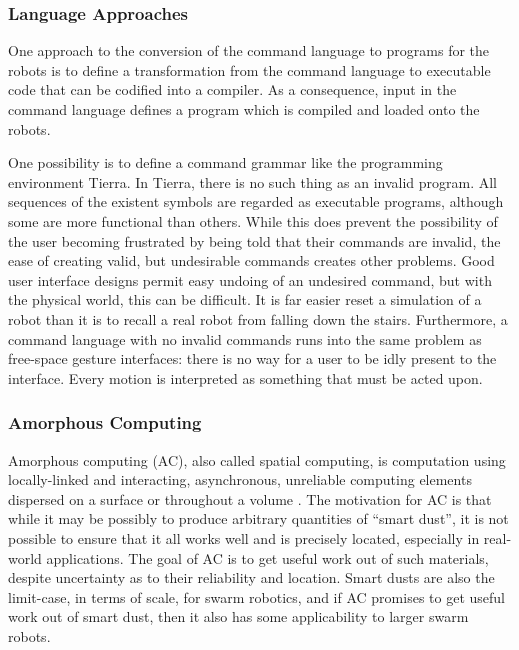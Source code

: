 \documentclass[]{article}
\begin{document}
\subsubsection {Language Approaches}

One approach to the conversion of the command language to programs for the robots is to define a transformation from the command language to executable code that can be codified into a compiler. 
As a consequence, input in the command language defines a program which is compiled and loaded onto the robots. 

One possibility is to define a command grammar like the programming environment Tierra. \cite{ray1991approach}
In Tierra, there is no such thing as an invalid program. 
All sequences of the existent symbols are regarded as executable programs, although some are more functional than others. 
While this does prevent the possibility of the user becoming frustrated by being told that their commands are invalid, the ease of creating valid, but undesirable commands creates other problems. 
Good user interface designs permit easy undoing of an undesired command, but with the physical world, this can be difficult. 
It is far easier reset a simulation of a robot than it is to recall a real robot from falling down the stairs. 
Furthermore, a command language with no invalid commands runs into the same problem as free-space gesture interfaces: there is no way for a user to be idly present to the interface.
Every motion is interpreted as something that must be acted upon. 

\subsubsection{Amorphous Computing}

Amorphous computing (AC), also called spatial computing, is computation using locally-linked and interacting, asynchronous, unreliable computing elements dispersed on a surface or throughout a volume \cite{abelson2000amorphous}. 
The motivation for AC is that while it may be possibly to produce arbitrary quantities of ``smart dust'', it is not possible to ensure that it all works well and is precisely located, especially in real-world applications.
The goal of AC is to get useful work out of such materials, despite uncertainty as to their reliability and location. 
Smart dusts are also the limit-case, in terms of scale, for swarm robotics, and if AC promises to get useful work out of smart dust, then it also has some applicability to larger swarm robots.
\end{document}
